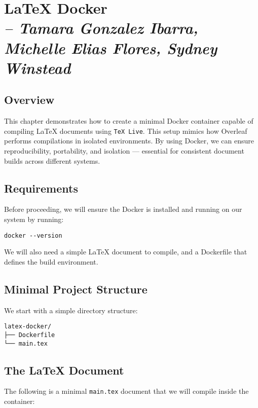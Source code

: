 \chapter{LaTeX Docker \\ 
\small{\textit{-- Tamara Gonzalez Ibarra, Michelle Elias Flores, Sydney Winstead}}}
\label{Chapter::itLaTeXDocker}

\section{Overview}

This chapter demonstrates how to create a minimal Docker container capable of compiling \LaTeX{} documents using \texttt{TeX Live}. This setup mimics how Overleaf performs compilations in isolated environments. By using Docker, we can ensure reproducibility, portability, and isolation — essential for consistent document builds across different systems.

\section{Requirements}

Before proceeding, we will ensure the Docker is installed and running on our system by running:

\begin{verbatim}
docker --version
\end{verbatim}

We will also need a simple \LaTeX{} document to compile, and a Dockerfile that defines the build environment.

\section{Minimal Project Structure}

We start with a simple directory structure:

\begin{verbatim}
latex-docker/
├── Dockerfile
└── main.tex
\end{verbatim}

\section{The LaTeX Document}

The following is a minimal \texttt{main.tex} document that we will compile inside the container:


